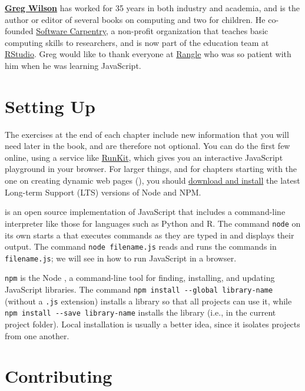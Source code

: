 \noindent
\textbf{\href{http://third-bit.com/}{Greg Wilson}} has worked for 35 years in both industry and
academia, and is the author or editor of several books on computing and two for
children. He co-founded \href{http://carpentries.org}{Software Carpentry}, a non-profit
organization that teaches basic computing skills to researchers, and is now part
of the education team at \href{http://rstudio.com}{RStudio}. Greg would like to
thank everyone at \href{https://rangle.io/}{Rangle} who was so patient with him when
he was learning JavaScript.

\section{Setting Up}\label{s:intro-setup}

The exercises at the end of each chapter include new information
that you will need later in the book,
and are therefore not optional.
You can do the first few online,
using a service like \href{https://runkit.com/}{RunKit},
which gives you an interactive JavaScript playground in your browser.
For larger things,
and for chapters starting with the one on creating dynamic web pages (),
you should \href{https://nodejs.org/en/download/}{download and install} the latest Long-term Support (LTS) versions of Node and NPM.

 is an open source implementation of JavaScript
that includes a command-line interpreter like those for languages such as Python and R.
The command \texttt{node} on its own starts a 
that executes commands as they are typed in and displays their output.
The command \texttt{node\ filename.js} reads and runs the commands in \texttt{filename.js};
we will see in  how to run JavaScript in a browser.

\texttt{npm} is the Node ,
a command-line tool for finding, installing, and updating JavaScript libraries.
The command \texttt{npm\ install\ -\/-global\ library-name} (without a \texttt{.js} extension)
installs a library  so that all projects can use it,
while \texttt{npm\ install\ -\/-save\ library-name} installs the library 
(i.e., in the current project folder).
Local installation is usually a better idea,
since it isolates projects from one another.

\section{Contributing}\label{s:index-contrib}

